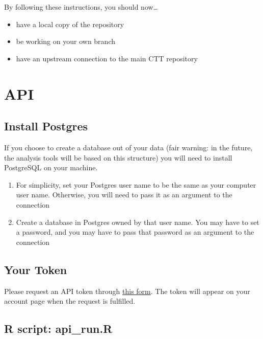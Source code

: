 \documentclass[
]{book}
\providecommand{\tightlist}{%
  \setlength{\itemsep}{0pt}\setlength{\parskip}{0pt}}
\begin{document}
By following these instructions, you should now\ldots{}

\begin{itemize}
\tightlist
\item
  have a local copy of the repository\\
\item
  be working on your own branch\\
\item
  have an upstream connection to the main CTT repository
\end{itemize}

\hypertarget{intro}{%
\chapter{API}\label{intro}}

\hypertarget{install-postgres}{%
\section{Install Postgres}\label{install-postgres}}

If you choose to create a database out of your data (fair warning: in the future, the analysis tools will be based on this structure) you will need to install PostgreSQL on your machine.

\begin{enumerate}
\def\labelenumi{\arabic{enumi}.}
\tightlist
\item
  For simplicity, set your Postgres user name to be the same as your computer user name. Otherwise, you will need to pass it as an argument to the connection\\
\item
  Create a database in Postgres owned by that user name. You may have to set a password, and you may have to pass that password as an argument to the connection
\end{enumerate}

\hypertarget{your-token}{%
\section{Your Token}\label{your-token}}

Please request an API token through \href{https://celltracktech.com/support-radio-api/}{this form}. The token will appear on your account page when the request is fulfilled.

\hypertarget{r-script-api_run.r}{%
\section{R script: api\_run.R}\label{r-script-api_run.r}}
\end{document}
